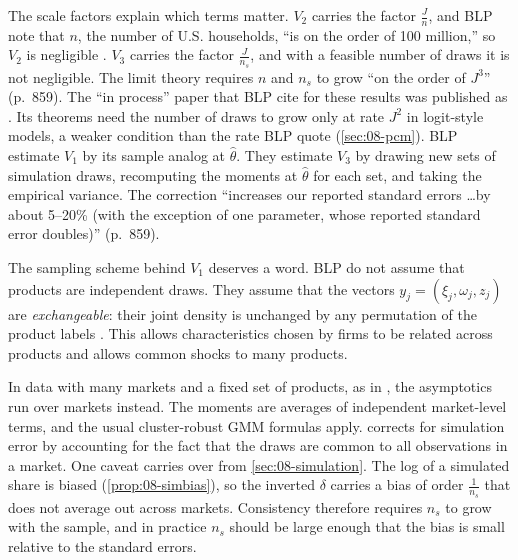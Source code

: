 The scale factors explain which terms matter. $V_2$ carries the factor $\frac{J}{n}$, and BLP note that $n$,
the number of U.S. households, ``is on the order of 100 million,'' so $V_2$ is negligible
\citep[p.~859]{BerryLevinsohnPakes1995}. $V_3$ carries the factor $\frac{J}{n_s}$, and with a feasible number
of draws it is not negligible. The limit theory requires $n$ and $n_s$ to grow ``on the order of $J^3$''
(p.~859). The ``in process'' paper that BLP cite for these results was published as
\citet{BerryLintonPakes2004}. Its theorems need the number of draws to grow only at rate $J^2$ in
logit-style models, a weaker condition than the rate BLP quote (\cref{sec:08-pcm}). BLP estimate $V_1$ by its sample analog at $\hat\theta$. They estimate $V_3$ by
drawing new sets of simulation draws, recomputing the moments at $\hat\theta$ for each set, and taking the
empirical variance. The correction ``increases our reported standard errors \dots by about 5--20\% (with the
exception of one parameter, whose reported standard error doubles)'' (p.~859).

The sampling scheme behind $V_1$ deserves a word. BLP do not assume that products are independent draws. They
assume that the vectors $y_j = (\xi_j, \omega_j, z_j)$ are \emph{exchangeable}: their joint density is
unchanged by any permutation of the product labels \citep[p.~856, n.~14]{BerryLevinsohnPakes1995}. This
allows characteristics chosen by firms to be related across products and allows common shocks to many
products.

In data with many markets and a fixed set of products, as in \citet{Nevo2001}, the asymptotics run over
markets instead. The moments are averages of independent market-level terms, and the usual cluster-robust
GMM formulas apply. \citet[p.~319]{Nevo2001} corrects for simulation error by accounting for the fact that
the draws are common to all observations in a market. One caveat carries over from \cref{sec:08-simulation}.
The log of a simulated share is biased (\cref{prop:08-simbias}), so the inverted $\delta$ carries a bias of
order $\frac{1}{n_s}$ that does not average out across markets. Consistency therefore requires $n_s$ to grow
with the sample, and in practice $n_s$ should be large enough that the bias is small relative to the standard
errors.


